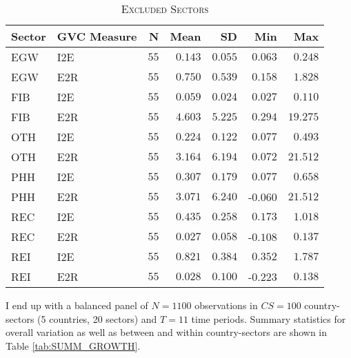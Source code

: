 \documentclass[a4paper]{article}
\begin{document}
\begin{table}[h!] \centering 
  \caption{\label{tab:EXCL_SEC}\textsc{Excluded Sectors}}
  \vspace{2mm}
\begin{tabular}{ llrrrrr} \toprule
Sector & GVC Measure  & N & Mean & SD & Min & Max \\ 
\midrule
EGW & I2E & $55$ & $0.143$ & $0.055$ & $0.063$ & $0.248$ \\ 
EGW & E2R & $55$ & $0.750$ & $0.539$ & $0.158$ & $1.828$ \\ 
FIB & I2E & $55$ & $0.059$ & $0.024$ & $0.027$ & $0.110$ \\ 
FIB & E2R & $55$ & $4.603$ & $5.225$ & $0.294$ & $19.275$ \\ 
OTH & I2E & $55$ & $0.224$ & $0.122$ & $0.077$ & $0.493$ \\ 
OTH & E2R & $55$ & $3.164$ & $6.194$ & $0.072$ & $21.512$ \\ 
PHH & I2E & $55$ & $0.307$ & $0.179$ & $0.077$ & $0.658$ \\ 
PHH & E2R & $55$ & $3.071$ & $6.240$ & -$0.060$ & $21.512$ \\ 
REC & I2E & $55$ & $0.435$ & $0.258$ & $0.173$ & $1.018$ \\ 
REC & E2R & $55$ & $0.027$ & $0.058$ & -$0.108$ & $0.137$ \\ 
REI & I2E & $55$ & $0.821$ & $0.384$ & $0.352$ & $1.787$ \\ 
REI & E2R & $55$ & $0.028$ & $0.100$ & -$0.223$ & $0.138$ \\ \bottomrule
\end{tabular} 
\end{table} 

I end up with a balanced panel of $N = 1100$ observations in $CS = 100$ country-sectors (5 countries, 20 sectors) and $T = 11$ time periods. Summary statistics for overall variation as well as between and within country-sectors are shown in Table \ref{tab:SUMM_GROWTH}. %
\end{document}
